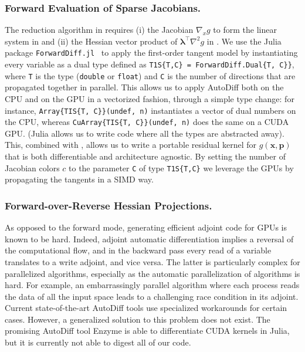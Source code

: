 \subsubsection{Forward Evaluation of Sparse Jacobians.}
\label{sec:jacobian:ad}
The reduction algorithm in  requires (i) the Jacobian
$\nabla_x g$ to form the linear system in  and (ii)
the Hessian vector product of $\bm{\lambda}^\top \nabla^2 g$ in .
We use the Julia package \lstinline{ForwardDiff.jl}~\cite{revels2016forward} to apply the first-order
tangent model  by instantiating every variable as a dual type
defined as \verb+T1S{T,C} = ForwardDiff.Dual{T, C}}+,
where \lstinline{T} is the type ({\tt double} or {\tt float}) and
\lstinline{C} is the number of directions that are propagated together in
parallel. This allows us to apply AutoDiff both on the CPU and on the GPU in a
vectorized fashion, through a simple type change:
for instance,
\lstinline+Array{TIS{T, C}}(undef, n)+ instantiates a vector of dual numbers on the CPU,
whereas \lstinline+CuArray{TIS{T, C}}(undef, n)+ does the same on a CUDA GPU.
(Julia allows us to write code where all the types are abstracted away).
This, combined with \KA, allows us to write a portable residual kernel for
$g(\bm{x}, \bm{p})$ that is both differentiable and architecture agnostic. By setting the
number of Jacobian colors $c$ to the parameter \lstinline|C| of type \lstinline|T1S{T,C}| we
leverage the GPUs by propagating the tangents in a SIMD way.

\subsubsection{Forward-over-Reverse Hessian Projections.}
\label{sec:hessian:ad}
As opposed to the forward mode,
generating efficient adjoint code for GPUs is known to be hard.
Indeed, adjoint automatic differentiation implies a reversal of the computational flow,
and in the backward pass every read of a variable translates to a write adjoint,
and vice versa. The latter is particularly complex for parallelized
algorithms, especially as the automatic parallelization of algorithms
is hard. For example, an
embarrassingly parallel algorithm where each process reads the data of all
the input space leads to a challenging race condition in its adjoint.
Current state-of-the-art AutoDiff tools use specialized
workarounds for certain cases. However, a generalized solution to this
problem does not exist. The promising AutoDiff tool Enzyme
\cite{enzymeNeurips} is able to differentiate CUDA kernels in Julia, but  it
is currently not able to digest all of our code.

